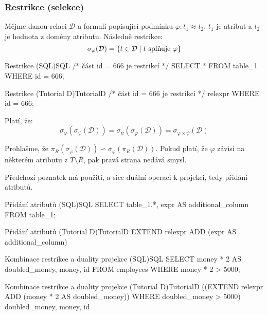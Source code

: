 \subsubsection{Restrikce (selekce)}
Mějme danou relaci $\mathcal{D}$ a formulí popisující podmínku $\varphi : t_{1} \approx t_{2}$. $t_{1}$ je atribut a $t_{2}$ je hodnota z domény atributu. Následně restrikce:
$$
\sigma_{\varphi}(\mathcal{D}) = \lbrace t \in \mathcal{D} \thickspace | \thickspace t \text{ splňuje } \varphi \rbrace
$$
\begin{upcode}{Restrikce (SQL)}{}{SQL}
/* část id = 666 je restrikcí */
SELECT * FROM table_1 WHERE id = 666;
\end{upcode}
\begin{upcode}{Restrikce (Tutorial D)}{}{TutorialD}
/* část id = 666 je restrikcí */
relexpr WHERE id = 666;
\end{upcode}
\begin{upquote}
Platí, že:
$$
\sigma_{\varphi}(\sigma_{\psi}(\mathcal{D})) = \sigma_{\psi}(\sigma_{\varphi}(\mathcal{D})) = \sigma_{\varphi \times \psi}(\mathcal{D})
$$
\end{upquote}

Prohlašme, že $\pi_{R} (\sigma_{\varphi} (\mathcal{D})) \backsim \sigma_{\varphi} (\pi_{R} (\mathcal{D}))$. Pokud platí, že $\varphi$ závisí na některém atributu z $T \setminus R$, pak pravá strana nedává smysl.

Předchozí poznatek má použití, a sice duální operaci k projekci, tedy přidání atributů.
\begin{upcode}{Přidání atributů (SQL)}{}{SQL}
SELECT table_1.*, expr AS additional_column FROM table_1;
\end{upcode}
\begin{upcode}{Přidání atributů (Tutorial D)}{}{TutorialD}
EXTEND relexpr ADD (expr AS additional_column)
\end{upcode}
\begin{upcode}{Kombinace restrikce a duality projekce (SQL)}{}{SQL}
SELECT	money * 2 AS doubled_money, money, id
FROM 	employees
WHERE	money * 2 > 5000;
\end{upcode}
\begin{upcode}{Kombinace restrikce a duality projekce (Tutorial D)}{}{TutorialD}
((EXTEND relexpr ADD (money * 2 AS doubled_money))
WHERE doubled_money > 5000) {doubled_money, money, id}
\end{upcode}
